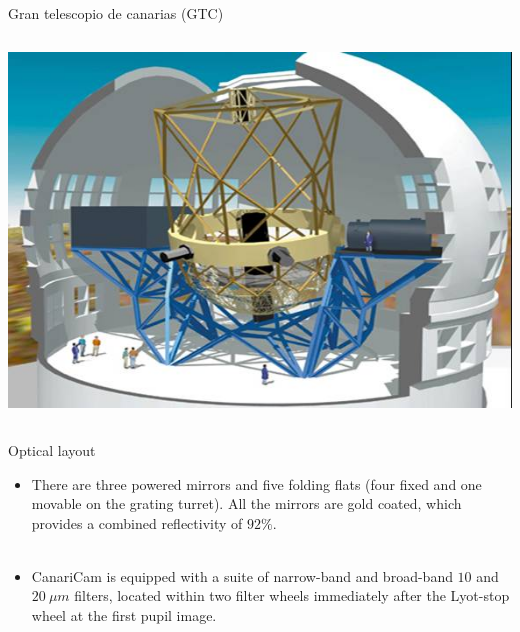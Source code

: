 \documentclass{beamer}
\begin{document}
\begin{frame}{Gran telescopio de canarias (GTC)}
\begin{columns}
\begin{column}{0.45\textwidth}
\begin{center}
\includegraphics[height=0.41\textheight]{imgr1.png}
\end{center}
\end{column}
\end{columns}
\end{frame}




\begin{frame}{Optical layout}

\begin{itemize}
\item There are three powered mirrors and five folding flats (four fixed and one movable on the grating turret). All the mirrors are gold coated, which provides a combined reflectivity of $92\%$. \\~\\

\item CanariCam is equipped with a suite of narrow-band and broad-band $10$ and $20~\mu m$ filters,
located within two filter wheels immediately after the Lyot-stop wheel at the first pupil
image.
\end{itemize}
\end{frame}
\end{document}
